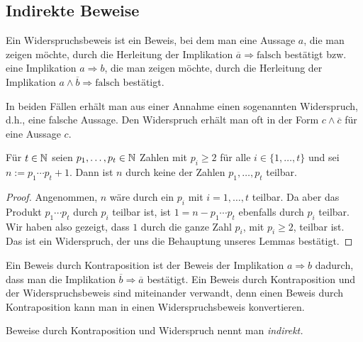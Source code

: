 \subsection{Indirekte Beweise} 


\begin{bem}
	Ein Widerspruchsbeweis ist ein Beweis, bei dem man eine Aussage $a$, die man zeigen möchte, durch die Herleitung der Implikation $\overline{a} \Rightarrow \text{falsch}$ bestätigt bzw. 
	eine Implikation $a \Rightarrow b$, die man zeigen möchte, durch die Herleitung der Implikation $a \wedge \overline{b} \Rightarrow \text{falsch}$ bestätigt. 
	
	In beiden Fällen erhält man aus einer Annahme einen sogenannten Widerspruch, d.h., eine falsche Aussage. Den Widerspruch erhält man oft in der Form $c \wedge \overline{c}$ für eine Aussage $c$. 
\end{bem} 

\begin{lem}
	Für $t \in \mathbb{N}$ seien $p_1,\ldots,p_t \in \mathbb{N}$ Zahlen mit $p_i \ge 2$ für alle $i \in \{1,\ldots,t\}$ und sei $n := p_1 \cdots p_t + 1$. Dann ist $n$ durch keine der Zahlen $p_1,\ldots,p_t$ teilbar. 
\end{lem} 
\begin{proof} 
	Angenommen, $n$ wäre durch ein $p_i$ mit $i=1,\ldots,t$ teilbar. Da aber das Produkt $p_1 \cdots p_t$ durch $p_i$ teilbar ist, ist $1 = n - p_1 \cdots p_t$ ebenfalls durch $p_i$ teilbar. Wir haben also gezeigt, dass $1$ durch die ganze Zahl $p_i$, mit $p_i \ge 2$, teilbar ist. Das ist ein Widerspruch, der uns die Behauptung unseres Lemmas bestätigt. 
\end{proof} 

\begin{bem}
	Ein Beweis durch Kontraposition ist der Beweis der Implikation $a \Rightarrow b$ dadurch, dass man die Implikation $\overline{b} \Rightarrow \overline{a}$ bestätigt. Ein  Beweis durch Kontraposition und der Widerspruchsbeweis sind miteinander verwandt, denn einen Beweis durch Kontraposition kann man in einen Widerspruchsbeweis konvertieren. 
\end{bem} 

\begin{bem}
	Beweise durch Kontraposition und Widerspruch nennt man \emph{indirekt.} 
\end{bem} 

